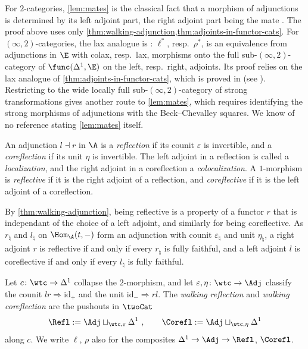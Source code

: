\begin{rmk}
\label{rmk:mates-2cat}
For $2$-categories, \cref{lem:mates} is the classical fact that a morphism of adjunctions is determined by its left adjoint part, the right adjoint part being the mate \cite{kellystreet1974review}. The proof above uses only \cref{thm:walking-adjunction,thm:adjoints-in-functor-cats}.
For $(\infty,2)$-categories, the lax analogue is \cite[Cor.~4.8]{haugseng2021laxmonads}: $\ell^{*}$, resp.\ $\rho^{*}$, is an equivalence from adjunctions in $\E$ with colax, resp.\ lax, morphisms onto the full sub-$(\infty,2)$-category of $\func(\Delta^{1},\E)$ on the left, resp.\ right, adjoints. Its proof relies on the lax analogue of \cref{thm:adjoints-in-functor-cats}, which is proved in \cite[Cor.~5.2.10]{abellangagnahaugseng2024straightening} (see \cite[Rem.~5.2.11]{abellangagnahaugseng2024straightening}). Restricting to the wide locally full sub-$(\infty,2)$-category of strong transformations \cite[Cor.~2.8.12]{abellangagnahaugseng2024straightening} gives another route to \cref{lem:mates}, which requires identifying the strong morphisms of adjunctions with the Beck--Chevalley squares. We know of no reference stating \cref{lem:mates} itself.
\end{rmk}

\begin{defi}
\label{def:reflection}
An adjunction $l \dashv r$ in $\A$ is a \emph{reflection} if its counit $\varepsilon$ is invertible, and a \emph{coreflection} if its unit $\eta$ is invertible.
The left adjoint in a reflection is called a \emph{localization}, and the right adjoint in a coreflection a \emph{colocalization}.
A $1$-morphism is \emph{reflective} if it is the right adjoint of a reflection, and \emph{coreflective} if it is the left adjoint of a coreflection.
\end{defi}

By \cref{thm:walking-adjunction}, being reflective is a property of a functor $ r $ that is independant of the choice of a left adjoint,
and similarly for being coreflective.
As $r_{\natural}$ and $l_{\natural}$ on $\Hom_{\A}(t,-)$ form an adjunction with counit $\varepsilon_{\natural}$ and unit $\eta_{\natural}$, a right adjoint $r$ is reflective if and only if every $r_{\natural}$ is fully faithful, and a left adjoint $l$ is coreflective if and only if every $l_{\natural}$ is fully faithful.

Let $c\colon \wtc \to \Delta^{1}$ collapse the $2$-morphism, and let $\varepsilon,\eta\colon \wtc \to \Adj$ classify the counit $lr \Rightarrow \mathrm{id}_{+}$ and the unit $\mathrm{id}_{-} \Rightarrow rl$. The \emph{walking reflection} and \emph{walking coreflection} are the pushouts in $\twoCat$
\[
\Refl := \Adj \sqcup_{\wtc,\varepsilon} \Delta^{1} \ , \qquad \Corefl := \Adj \sqcup_{\wtc,\eta} \Delta^{1}
\]
along $c$. We write $\ell$, $\rho$ also for the composites $\Delta^{1} \to \Adj \to \Refl$, $\Corefl$.

